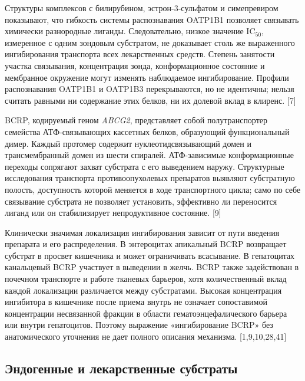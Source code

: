 \documentclass[11pt]{article}
\begin{document}
Структуры комплексов с билирубином, эстрон-3-сульфатом и симепревиром показывают, что гибкость системы распознавания OATP1B1 позволяет связывать химически разнородные лиганды. Следовательно, низкое значение \(\mathrm{IC}_{50}\), измеренное с одним зондовым субстратом, не доказывает столь же выраженного ингибирования транспорта всех лекарственных средств. Степень занятости участка связывания, концентрация зонда, конформационное состояние и мембранное окружение могут изменять наблюдаемое ингибирование. Профили распознавания OATP1B1 и OATP1B3 перекрываются, но не идентичны; нельзя считать равными ни содержание этих белков, ни их долевой вклад в клиренс. [7]

BCRP, кодируемый геном \textit{ABCG2}, представляет собой полутранспортер семейства АТФ-связывающих кассетных белков, образующий функциональный димер. Каждый протомер содержит нуклеотидсвязывающий домен и трансмембранный домен из шести спиралей. АТФ-зависимые конформационные переходы сопрягают захват субстрата с его выведением наружу. Структурные исследования транспорта противоопухолевых препаратов выявляют субстратную полость, доступность которой меняется в ходе транспортного цикла; само по себе связывание субстрата не позволяет установить, эффективно ли переносится лиганд или он стабилизирует непродуктивное состояние. [9]

Клинически значимая локализация ингибирования зависит от пути введения препарата и его распределения. В энтероцитах апикальный BCRP возвращает субстрат в просвет кишечника и может ограничивать всасывание. В гепатоцитах канальцевый BCRP участвует в выведении в желчь. BCRP также задействован в почечном транспорте и работе тканевых барьеров, хотя количественный вклад каждой локализации различается между субстратами. Высокая концентрация ингибитора в кишечнике после приема внутрь не означает сопоставимой концентрации несвязанной фракции в области гематоэнцефалического барьера или внутри гепатоцитов. Поэтому выражение «ингибирование BCRP» без анатомического уточнения не дает полного описания механизма. [1,9,10,28,41]

\subsection{Эндогенные и лекарственные субстраты}
\end{document}
